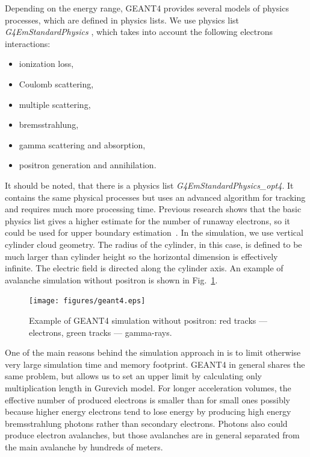 \documentclass[doublecol,linenumbers]{epl2} %
\begin{document}
Depending on the energy range, GEANT4 provides several models of physics processes, which are defined in physics lists. We use physics list \textit{G4EmStandardPhysics} , which takes into account the following electrons interactions:

\begin{itemize}
    \item ionization loss,
    \item Coulomb scattering,
    \item multiple scattering,
    \item bremsstrahlung,
    \item gamma scattering and absorption,
    \item positron generation and annihilation.
\end{itemize}
It should be noted, that there is a physics list \textit{G4EmStandardPhysics\_opt4}. It contains the same physical processes but uses an advanced algorithm for tracking and requires much more processing time. Previous research shows that the basic physics list gives a higher estimate for the number of runaway electrons, so it could be used for upper boundary estimation~\cite{npmdwyer}.
In the simulation, we use vertical cylinder cloud geometry. The radius of the cylinder, in this case, is defined to be much larger than cylinder height so the horizontal dimension is effectively infinite. The electric field is directed along the cylinder axis. An example of avalanche simulation without positron is shown in Fig.~\ref{fig:geant4}.
\begin{figure}[h]
    \centering
    \texttt{[image: figures/geant4.eps]}
    \caption{Example of GEANT4 simulation without positron: red tracks --- electrons, green tracks --- gamma-rays.}
    \label{fig:geant4}
\end{figure}
One of the main reasons behind the simulation approach in \cite{Oreshkin_2018} is to limit otherwise very large simulation time and memory footprint. GEANT4 in general shares the same problem, but allows us to set an upper limit by calculating only multiplication length in Gurevich model. For longer acceleration volumes, the effective number of produced electrons is smaller than for small ones possibly because higher energy electrons tend to lose energy by producing high energy bremsstrahlung photons rather than secondary electrons. Photons also could produce electron avalanches, but those avalanches are in general separated from the main avalanche by hundreds of meters.
\end{document}
